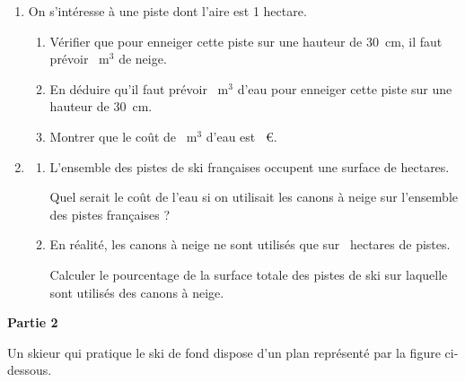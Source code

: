 \documentclass[exercice,a4]{thedocument}%
\begin{document}
\begin{enumerate}
\item On s’intéresse à une piste dont l’aire est 1 hectare.
	\begin{enumerate}
		\item Vérifier que pour enneiger cette piste sur une hauteur de $30$~cm, il faut prévoir ~m$^3$ de neige.
		\item En déduire qu’il faut prévoir ~m$^3$ d'eau pour enneiger cette piste sur une hauteur de $30$~cm.
		\item Montrer que le coût de ~m$^3$ d’eau est ~\euro.
	\end{enumerate}
\item 
	\begin{enumerate}
		\item L’ensemble des pistes de ski françaises occupent une surface de  hectares.

Quel serait le coût de l’eau si on utilisait les canons à neige sur l’ensemble des pistes françaises ?
		\item En réalité, les canons à neige ne sont utilisés que sur ~hectares de pistes.

Calculer le pourcentage de la surface totale des pistes de ski sur laquelle sont utilisés des canons à neige.
	\end{enumerate}
\end{enumerate}

\medskip

\textbf{Partie 2}

\medskip

Un skieur qui pratique le ski de fond dispose d’un plan représenté par la figure ci-dessous.
\end{document}
